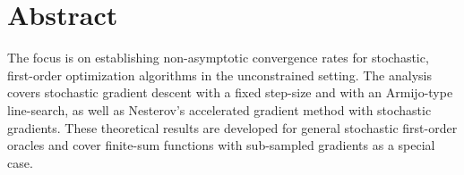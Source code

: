
\chapter{Abstract}



The focus is on establishing non-asymptotic convergence rates for stochastic, first-order optimization algorithms in the unconstrained setting. 
The analysis covers stochastic gradient descent with a fixed step-size and with an Armijo-type line-search, as well as Nesterov's accelerated gradient method with stochastic gradients.
These theoretical results are developed for general stochastic first-order oracles and cover finite-sum functions with sub-sampled gradients as a special case. 
